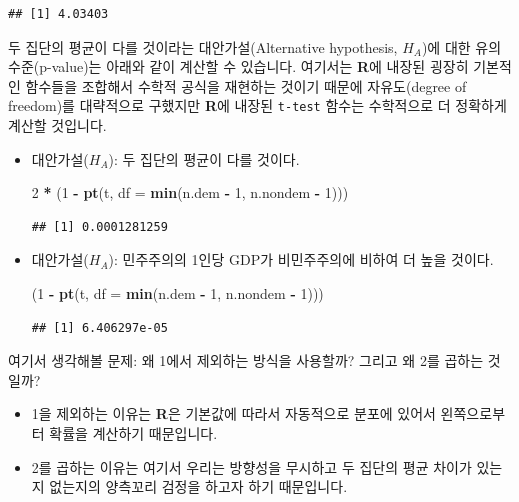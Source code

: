 \documentclass[]{book}
\newenvironment{Shaded}{\begin{snugshade}}{\end{snugshade}}
\newcommand{\DataTypeTok}[1]{\textcolor[rgb]{0.13,0.29,0.53}{#1}}
\newcommand{\DecValTok}[1]{\textcolor[rgb]{0.00,0.00,0.81}{#1}}
\newcommand{\KeywordTok}[1]{\textcolor[rgb]{0.13,0.29,0.53}{\textbf{#1}}}
\newcommand{\NormalTok}[1]{#1}
\newcommand{\OperatorTok}[1]{\textcolor[rgb]{0.81,0.36,0.00}{\textbf{#1}}}
\newcommand{\StringTok}[1]{\textcolor[rgb]{0.31,0.60,0.02}{#1}}
\providecommand{\tightlist}{%
  \setlength{\itemsep}{0pt}\setlength{\parskip}{0pt}}
\begin{document}
\begin{verbatim}
## [1] 4.03403
\end{verbatim}

두 집단의 평균이 다를 것이라는 대안가설(Alternative hypothesis, \(H_A\))에 대한 유의수준(p-value)는 아래와 같이 계산할 수 있습니다. 여기서는 \textbf{R}에 내장된 굉장히 기본적인 함수들을 조합해서 수학적 공식을 재현하는 것이기 때문에 자유도(degree of freedom)를 대략적으로 구했지만 \textbf{R}에 내장된 \texttt{t-test} 함수는 수학적으로 더 정확하게 계산할 것입니다.

\begin{itemize}
\item
  대안가설(\(H_A\)): 두 집단의 평균이 다를 것이다.

\begin{Shaded}
\begin{Highlighting}[]
\DecValTok{2} \OperatorTok{*}\StringTok{ }\NormalTok{(}\DecValTok{1} \OperatorTok{-}\StringTok{ }\KeywordTok{pt}\NormalTok{(t, }\DataTypeTok{df =} \KeywordTok{min}\NormalTok{(n.dem }\OperatorTok{-}\StringTok{ }\DecValTok{1}\NormalTok{, n.nondem }\OperatorTok{-}\StringTok{ }\DecValTok{1}\NormalTok{)))}
\end{Highlighting}
\end{Shaded}

\begin{verbatim}
## [1] 0.0001281259
\end{verbatim}
\item
  대안가설(\(H_A\)): 민주주의의 1인당 GDP가 비민주주의에 비하여 더 높을 것이다.

\begin{Shaded}
\begin{Highlighting}[]
\NormalTok{(}\DecValTok{1} \OperatorTok{-}\StringTok{ }\KeywordTok{pt}\NormalTok{(t, }\DataTypeTok{df =} \KeywordTok{min}\NormalTok{(n.dem }\OperatorTok{-}\StringTok{ }\DecValTok{1}\NormalTok{, n.nondem }\OperatorTok{-}\StringTok{ }\DecValTok{1}\NormalTok{)))}
\end{Highlighting}
\end{Shaded}

\begin{verbatim}
## [1] 6.406297e-05
\end{verbatim}
\end{itemize}

여기서 생각해볼 문제: 왜 1에서 제외하는 방식을 사용할까? 그리고 왜 2를 곱하는 것일까?

\begin{itemize}
\tightlist
\item
  1을 제외하는 이유는 \textbf{R}은 기본값에 따라서 자동적으로 분포에 있어서 왼쪽으로부터 확률을 계산하기 때문입니다.
\item
  2를 곱하는 이유는 여기서 우리는 방향성을 무시하고 두 집단의 평균 차이가 있는지 없는지의 양측꼬리 검정을 하고자 하기 때문입니다.
\end{itemize}
\end{document}
